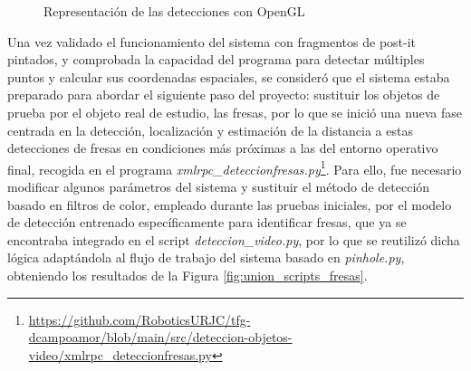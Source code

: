     \begin{figure}[H]
      \begin{center}
        \subcapcentertrue
        \hspace{1mm}
      \end{center}
      \caption{Representación de las detecciones con OpenGL}
      \label{fig:openGL_ventana}
    \end{figure}

Una vez validado el funcionamiento del sistema con fragmentos de post-it pintados, y comprobada la capacidad del programa para detectar múltiples puntos y calcular sus coordenadas espaciales, se consideró que el sistema estaba preparado para abordar el siguiente paso del proyecto: sustituir los objetos de prueba por el objeto real de estudio, las fresas, por lo que se inició una nueva fase centrada en la detección, localización y estimación de la distancia a estas detecciones de fresas en condiciones más próximas a las del entorno operativo final, recogida en el programa \textit{xmlrpc\_deteccionfresas.py}\footnote{\url{https://github.com/RoboticsURJC/tfg-dcampoamor/blob/main/src/deteccion-objetos-video/xmlrpc_deteccionfresas.py}}. Para ello, fue necesario modificar algunos parámetros del sistema y sustituir el método de detección basado en filtros de color, empleado durante las pruebas iniciales, por el modelo de detección entrenado específicamente para identificar fresas, que ya se encontraba integrado en el script \textit{deteccion\_video.py}, por lo que se reutilizó dicha lógica adaptándola al flujo de trabajo del sistema basado en \textit{pinhole.py}, obteniendo los resultados de la Figura \ref{fig:union_scripts_fresas}.

